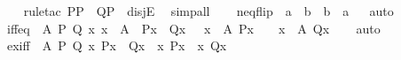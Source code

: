 \begin{isabellebody}
%
\isadelimproof
\ \ %
\endisadelimproof
%
\isatagproof
{}\isamarkupfalse%
\ {\isacharparenleft}{\kern0pt}rule{\isacharunderscore}{\kern0pt}tac\ P{\isacharequal}{\kern0pt}P\ \ Q{\isacharequal}{\kern0pt}{\isachardoublequoteopen}{\isasymnot}P{\isachardoublequoteclose}\ \ disjE{\isacharparenright}{\kern0pt}\ \isamarkupfalse%
\ simp{\isacharunderscore}{\kern0pt}all\ \isamarkupfalse%
%
\endisatagproof
{\isafoldproof}%
%
\isadelimproof
\ \isanewline
%
\endisadelimproof
\isanewline
{}\isamarkupfalse%
\ neq{\isacharunderscore}{\kern0pt}flip\ {\isacharcolon}{\kern0pt}\ {\isachardoublequoteopen}a\ {\isasymnoteq}\ b\ {\isasymLongrightarrow}\ b\ {\isasymnoteq}\ a{\isachardoublequoteclose}%
\isadelimproof
\ %
\endisadelimproof
%
\isatagproof
{}\isamarkupfalse%
\ auto%
\endisatagproof
{\isafoldproof}%
%
\isadelimproof
%
\endisadelimproof
\isanewline
\isanewline
{}\isamarkupfalse%
\ iff{\isacharunderscore}{\kern0pt}eq\ {\isacharcolon}{\kern0pt}\ {\isachardoublequoteopen}{\isasymAnd}A\ P\ Q{\isachardot}{\kern0pt}\ {\isacharparenleft}{\kern0pt}{\isasymAnd}x{\isachardot}{\kern0pt}\ x\ {\isasymin}\ A\ {\isasymLongrightarrow}\ P{\isacharparenleft}{\kern0pt}x{\isacharparenright}{\kern0pt}\ {\isasymlongleftrightarrow}\ Q{\isacharparenleft}{\kern0pt}x{\isacharparenright}{\kern0pt}{\isacharparenright}{\kern0pt}\ {\isasymLongrightarrow}\ {\isacharbraceleft}{\kern0pt}\ x\ {\isasymin}\ A{\isachardot}{\kern0pt}\ P{\isacharparenleft}{\kern0pt}x{\isacharparenright}{\kern0pt}\ {\isacharbraceright}{\kern0pt}\ {\isacharequal}{\kern0pt}\ {\isacharbraceleft}{\kern0pt}\ x\ {\isasymin}\ A{\isachardot}{\kern0pt}\ Q{\isacharparenleft}{\kern0pt}x{\isacharparenright}{\kern0pt}\ {\isacharbraceright}{\kern0pt}{\isachardoublequoteclose}%
\isadelimproof
\ %
\endisadelimproof
%
\isatagproof
{}\isamarkupfalse%
\ auto%
\endisatagproof
{\isafoldproof}%
%
\isadelimproof
%
\endisadelimproof
\isanewline
\isanewline
{}\isamarkupfalse%
\ ex{\isacharunderscore}{\kern0pt}iff\ {\isacharcolon}{\kern0pt}\ {\isachardoublequoteopen}{\isasymAnd}A\ P\ Q{\isachardot}{\kern0pt}\ {\isacharparenleft}{\kern0pt}{\isasymAnd}x{\isachardot}{\kern0pt}\ P{\isacharparenleft}{\kern0pt}x{\isacharparenright}{\kern0pt}\ {\isasymlongleftrightarrow}\ Q{\isacharparenleft}{\kern0pt}x{\isacharparenright}{\kern0pt}{\isacharparenright}{\kern0pt}\ {\isasymLongrightarrow}\ {\isacharparenleft}{\kern0pt}{\isasymexists}x{\isachardot}{\kern0pt}\ P{\isacharparenleft}{\kern0pt}x{\isacharparenright}{\kern0pt}{\isacharparenright}{\kern0pt}\ {\isasymlongleftrightarrow}\ {\isacharparenleft}{\kern0pt}{\isasymexists}x{\isachardot}{\kern0pt}\ Q{\isacharparenleft}{\kern0pt}x{\isacharparenright}{\kern0pt}{\isacharparenright}{\kern0pt}{\isachardoublequoteclose}%

\end{isabellebody}
